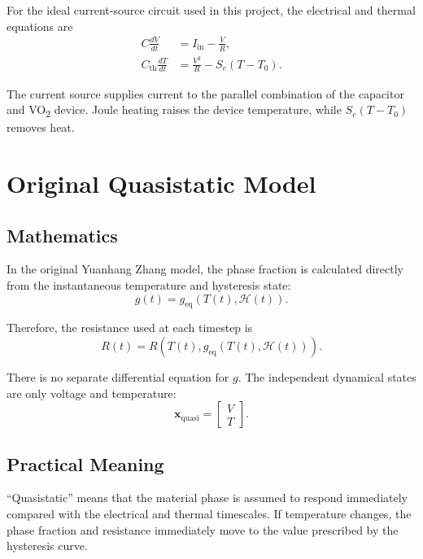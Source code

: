 \documentclass[11pt]{article}
\newcommand{\VOtwo}{VO\textsubscript{2}}
\begin{document}
For the ideal current-source circuit used in this project, the electrical and thermal equations are
\begin{align}
C\frac{dV}{dt} &= I_{\mathrm{in}}-\frac{V}{R}, \label{eq:current}\\
C_{\mathrm{th}}\frac{dT}{dt} &= \frac{V^2}{R}-S_e(T-T_0). \label{eq:thermal}
\end{align}

The current source supplies current to the parallel combination of the capacitor and \VOtwo{} device. Joule heating raises the device temperature, while $S_e(T-T_0)$ removes heat.

\section{Original Quasistatic Model}

\subsection{Mathematics}

In the original Yuanhang Zhang model, the phase fraction is calculated directly from the instantaneous temperature and hysteresis state:
\begin{equation}
g(t) = g_{\mathrm{eq}}\!\left(T(t),\mathcal{H}(t)\right).
\label{eq:quasistatic}
\end{equation}

Therefore, the resistance used at each timestep is
\begin{equation}
R(t) = R\!\left(T(t),g_{\mathrm{eq}}(T(t),\mathcal{H}(t))\right).
\end{equation}

There is no separate differential equation for $g$. The independent dynamical states are only voltage and temperature:
\begin{equation}
\mathbf{x}_{\mathrm{quasi}} =
\begin{bmatrix}
V \\ T
\end{bmatrix}.
\end{equation}

\subsection{Practical Meaning}

``Quasistatic'' means that the material phase is assumed to respond immediately compared with the electrical and thermal timescales. If temperature changes, the phase fraction and resistance immediately move to the value prescribed by the hysteresis curve.
\end{document}
